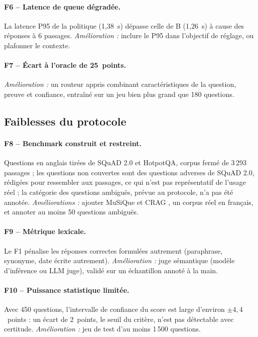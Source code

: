 \documentclass[11pt,a4paper]{article}
\begin{document}
\paragraph{F6 -- Latence de queue dégradée.} La latence P95 de la politique (1,38~s) dépasse celle de B
(1,26~s) à cause des réponses à 6 passages. \emph{Amélioration :} inclure le P95 dans l'objectif de
réglage, ou plafonner le contexte.

\paragraph{F7 -- Écart à l'oracle de 25~points.} \emph{Amélioration :} un routeur appris combinant
caractéristiques de la question, preuve et confiance, entraîné sur un jeu bien plus grand que
180 questions.

\subsection{Faiblesses du protocole}

\paragraph{F8 -- Benchmark construit et restreint.} Questions en anglais tirées de SQuAD 2.0 et
HotpotQA, corpus fermé de 3\,293 passages ; les questions non couvertes sont des questions adverses de
SQuAD 2.0, rédigées pour ressembler aux passages, ce qui n'est pas représentatif de l'usage réel ; la
catégorie des questions ambiguës, prévue au protocole, n'a pas été annotée.
\emph{Améliorations :} ajouter MuSiQue \citep{trivedi2022musique} et CRAG \citep{yang2024cragbench},
un corpus réel en français, et annoter au moins 50 questions ambiguës.

\paragraph{F9 -- Métrique lexicale.} Le F1 pénalise les réponses correctes formulées autrement
(paraphrase, synonyme, date écrite autrement). \emph{Amélioration :} juge sémantique (modèle d'inférence
ou LLM juge), validé sur un échantillon annoté à la main.

\paragraph{F10 -- Puissance statistique limitée.} Avec 450 questions, l'intervalle de confiance du score
est large d'environ $\pm 4{,}4$~points : un écart de 2~points, le seuil du critère, n'est pas
détectable avec certitude. \emph{Amélioration :} jeu de test d'au moins 1\,500 questions.
\end{document}
